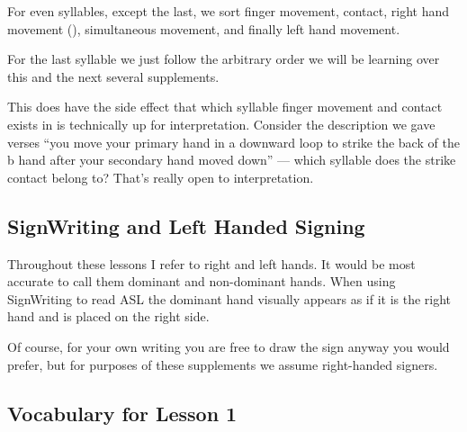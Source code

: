 \documentclass{article}
\begin{document}
For even syllables, except the last, we sort finger movement, contact, right hand movement (), simultaneous movement, and finally left hand movement.

For the last syllable we just follow the arbitrary order we will be learning over this and the next several supplements.

This does have the side effect that which syllable finger movement and contact exists in is technically up for interpretation.
Consider the description we gave verses ``you move your primary hand in a downward loop to strike the back of the b hand after your secondary hand moved down'' ---
which syllable does the strike contact belong to?
That's really open to interpretation.

\subsection{SignWriting and Left Handed Signing}

Throughout these lessons I refer to right and left hands.
It would be most accurate to call them dominant and non-dominant hands.
When using SignWriting to read ASL the dominant hand visually appears as if it is the right hand and is placed on the right side.

Of course, for your own writing you are free to draw the sign anyway you would prefer, but for purposes of these supplements we assume right-handed signers.

\subsection{Vocabulary for Lesson 1}
\end{document}
